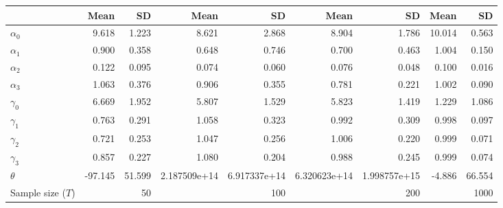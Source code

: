 
\begin{tabular}[t]{lrrrrrrrr}
\toprule
  & Mean & SD & Mean  & SD  & Mean   & SD   & Mean    & SD   \\
\midrule
$\alpha_{0}$ & 9.618 & 1.223 & 8.621 & 2.868 & 8.904 & 1.786 & 10.014 & 0.563\\
$\alpha_{1}$ & 0.900 & 0.358 & 0.648 & 0.746 & 0.700 & 0.463 & 1.004 & 0.150\\
$\alpha_{2}$ & 0.122 & 0.095 & 0.074 & 0.060 & 0.076 & 0.048 & 0.100 & 0.016\\
$\alpha_{3}$ & 1.063 & 0.376 & 0.906 & 0.355 & 0.781 & 0.221 & 1.002 & 0.090\\
$\gamma_{0}$ & 6.669 & 1.952 & 5.807 & 1.529 & 5.823 & 1.419 & 1.229 & 1.086\\
$\gamma_{1}$ & 0.763 & 0.291 & 1.058 & 0.323 & 0.992 & 0.309 & 0.998 & 0.097\\
$\gamma_{2}$ & 0.721 & 0.253 & 1.047 & 0.256 & 1.006 & 0.220 & 0.999 & 0.071\\
$\gamma_{3}$ & 0.857 & 0.227 & 1.080 & 0.204 & 0.988 & 0.245 & 0.999 & 0.074\\
$\theta$ & -97.145 & 51.599 & 2.187509e+14 & 6.917337e+14 & 6.320623e+14 & 1.998757e+15 & -4.886 & 66.554\\
Sample size ($T$) &  & 50 &  & 100 &  & 200 &  & 1000\\
\bottomrule
\end{tabular}
